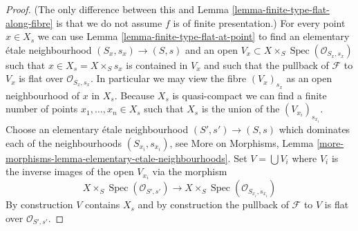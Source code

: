 \documentclass[10pt,a4paper]{amsart}
\theoremstyle{plain}
\theoremstyle{definition}
\theoremstyle{remark}
\numberwithin{equation}{subsection}
\def\Spec{\mathop{\mathrm{Spec}}}
\begin{document}
\begin{proof}
(The only difference between this and
Lemma \ref{lemma-finite-type-flat-along-fibre}
is that we do not assume $f$ is of finite presentation.)
For every point $x \in X_s$ we can use
Lemma \ref{lemma-finite-type-flat-at-point}
to find an elementary \'etale neighbourhood $(S_x, s_x) \to (S, s)$
and an open $V_x \subset X \times_S \Spec(\mathcal{O}_{S_x, s_x})$
such that $x \in X_s = X \times_S s_x$ is contained in $V_x$ and such that
the pullback of $\mathcal{F}$ to $V_x$ is flat over
$\mathcal{O}_{S_x, s_x}$. In particular we may view the fibre
$(V_x)_{s_x}$ as an open neighbourhood of $x$ in $X_s$.
Because $X_s$ is quasi-compact we can find a finite number of points
$x_1, \ldots, x_n \in X_s$ such that $X_s$ is the union of
the $(V_{x_i})_{s_{x_i}}$. Choose an elementary \'etale neighbourhood
$(S' , s') \to (S, s)$ which dominates each of the neighbourhoods
$(S_{x_i}, s_{x_i})$, see
More on Morphisms,
Lemma \ref{more-morphisms-lemma-elementary-etale-neighbourhoods}.
Set $V = \bigcup V_i$ where $V_i$ is the inverse images of the open
$V_{x_i}$ via the morphism
$$
X \times_S \Spec(\mathcal{O}_{S', s'})
\longrightarrow
X \times_S \Spec(\mathcal{O}_{S_{x_i}, s_{x_i}})
$$
By construction $V$ contains $X_s$ and by construction the pullback
of $\mathcal{F}$ to $V$ is flat over $\mathcal{O}_{S', s'}$.
\end{proof}
\end{document}
